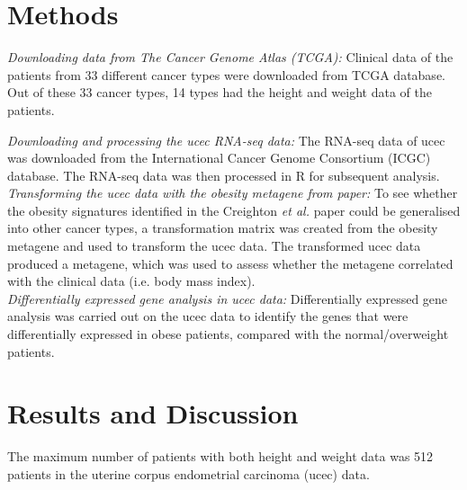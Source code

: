 \documentclass[a4paper,12pt]{report}
\begin{document}
\section*{Methods}

\textit{Downloading data from The Cancer Genome Atlas (TCGA):}
Clinical data of the patients from 33 different cancer types were downloaded from TCGA database.
Out of these 33 cancer types, 14 types had the height and weight data of the patients.

\textit{Downloading and processing the ucec RNA-seq data:}
The RNA-seq data of ucec was downloaded from the International Cancer Genome Consortium (ICGC) database.
The RNA-seq data was then processed in R for subsequent analysis.\\

\textit{Transforming the ucec data with the obesity metagene from \citet{Creighton2012} paper:}
To see whether the obesity signatures identified in the Creighton \textit{et al.} paper could be generalised into other cancer types, a transformation matrix was created from the obesity metagene and used to transform the ucec data.
The transformed ucec data produced a metagene, which was used to assess whether the metagene correlated with the clinical data (i.e. body mass index).
\\

\textit{Differentially expressed gene analysis in ucec data:}
Differentially expressed gene analysis was carried out on the ucec data to identify the genes that were differentially expressed in obese patients, compared with the normal/overweight patients.

\section*{Results and Discussion}

The maximum number of patients with both height and weight data was 512 patients in the uterine corpus endometrial carcinoma (ucec) data.\\


\printbibliography
\end{document}
